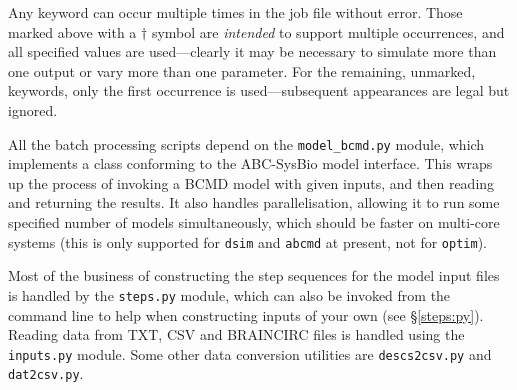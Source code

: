 \documentclass[a4paper,11pt]{article}
\begin{document}
Any keyword can occur multiple times in the job file without error. Those marked above with a $\dagger$ symbol are \textit{intended} to support multiple occurrences, and all specified values are used---clearly it may be necessary to simulate more than one output or vary more than one parameter. For the remaining, unmarked, keywords, only the first occurrence is used---subsequent appearances are legal but ignored.

All the batch processing scripts depend on the \texttt{model\_bcmd.py} module, which implements a class conforming to the ABC-SysBio model interface. This wraps up the process of invoking a BCMD model with given inputs, and then reading and returning the results. It also handles parallelisation, allowing it to run some specified number of models simultaneously, which should be faster on multi-core systems (this is only supported for \texttt{dsim} and \texttt{abcmd} at present, not for \texttt{optim}).

Most of the business of constructing the step sequences for the model input files is handled by the \texttt{steps.py} module, which can also be invoked from the command line to help when constructing inputs of your own (see \S\ref{steps:py}). Reading data from TXT, CSV and BRAINCIRC files is handled using the \texttt{inputs.py} module. Some other data conversion utilities are \texttt{descs2csv.py} and \texttt{dat2csv.py}.
\end{document}
